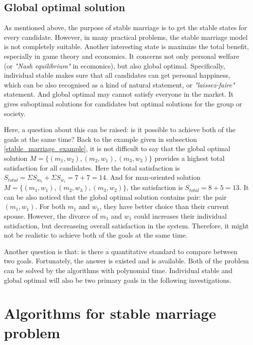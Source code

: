 \documentclass[14pt]{extarticle}
\begin{document}
\subsection{Global optimal solution}

As mentioned above, the purpose of stable marriage is to get the stable states for every candidate.
However, in many practical problems, the stable marriage model is not completely suitable. 
Another interesting state is maximize the total benefit, especially in game theory and economics. 
It concerns not only personal welfare (or {\it "Nash equilibrium"} in ecomonics), but also global optimal.
Specifically, individual stable makes sure that all candidates can get personal happiness, which can be also recognised as a kind of natural statement, or {\it "laissez-faire"} statement.
And global optimal may cannot satisfy everyone in the market. 
It gives suboptimal solutions for candidates but optimal solutions for the group or society.

Here, a question about this can be raised: is it possible to achieve both of the goals at the same time? 
Back to the example given in subsection \ref{stable_marriage_example}, 
it is not difficult to say that the global optimal solution $M = \{(m_1, w_2),(m_2,w_1),(m_3,w_3)\}$ provides a highest total satisfaction for all candidates. 
Here the total satisfaction is $S_{total} = \Sigma S_{m_i} + \Sigma S_{w_i} = 7 + 7 = 14$.
And for man-oriented solution $M = \{(m_1, w_1),(m_2,w_3),(m_3,w_2)\}$, the satisfaction is $S_{total} = 8 + 5 = 13$.
It can be also noticed that the global optimal solution contains pair: the pair $(m_1, w_1)$. 
For both $m_1$ and $w_1$, they have better choice than their current spouse.
However, the divorce of $m_1$ and $w_1$ could increases their individual satisfaction, but decreaseing overall satisfaction in the system.
Therefore, it might not be realistic to achieve both of the goals at the same time.

Another question is that: is there a quantitative standard to compare between two goals.
Fortunately, the answer is existed and is available.
Both of the problem can be solved by the algorithms with polynomial time. 
Individual stable and global optimal will also be two primary goals in the following investigations.

\section{Algorithms for stable marriage problem} \label{variants and algorithms}
\end{document}
